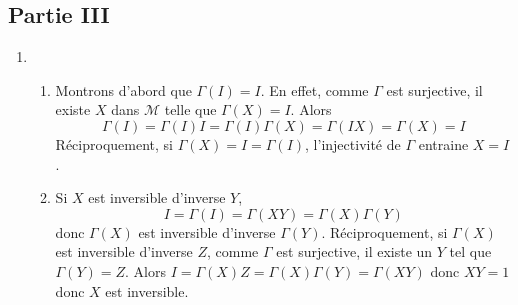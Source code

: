 \subsection*{Partie III}
\begin{enumerate}
\item 
\begin{enumerate}
\item Montrons d'abord que $\Gamma (I)=I$. En effet, comme $\Gamma$ est surjective, il existe $X$ dans $\mathcal{M}$ telle que $\Gamma(X)=I$. Alors 
\begin{displaymath}
\Gamma (I)=\Gamma (I)I=\Gamma (I)\Gamma (X)=\Gamma (IX)=\Gamma (X)=I  
\end{displaymath}
Réciproquement, si $\Gamma (X)=I=\Gamma (I)$, l'injectivit\'{e} de $\Gamma$ entraine $X=I$.

\item  Si $X$ est inversible d'inverse $Y$,
\begin{displaymath}
I=\Gamma (I)=\Gamma(XY)=\Gamma (X)\Gamma (Y) 
\end{displaymath}
donc $\Gamma (X)$ est inversible d'inverse $\Gamma (Y)$.\newline
R\'{e}ciproquement, si $\Gamma (X)$ est inversible d'inverse $Z$, comme $\Gamma $ est surjective, il existe un $Y$ tel que $\Gamma (Y)=Z$. Alors $I=\Gamma (X)Z=\Gamma (X)\Gamma (Y)=\Gamma (XY)$ donc $XY=1$ donc $X$ est inversible.
\end{enumerate}


\end{enumerate}
